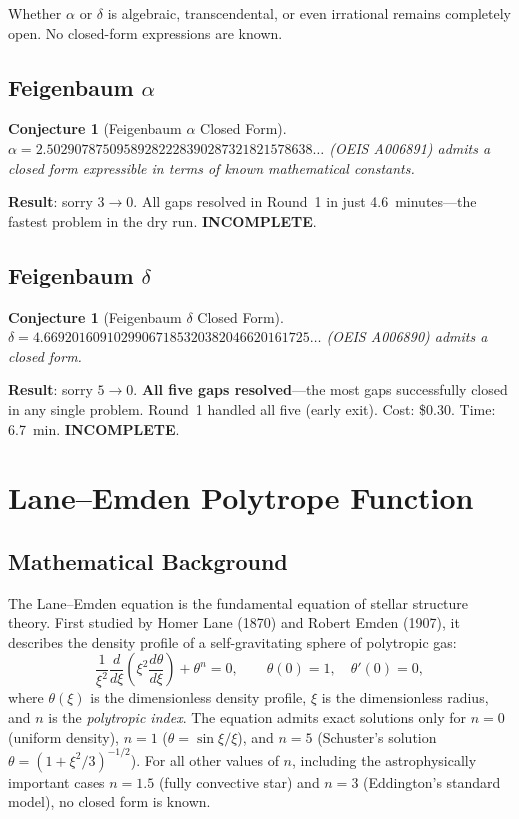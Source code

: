\documentclass[12pt,a4paper]{report}
\theoremstyle{plain}
\newtheorem{conjecture}[theorem]{Conjecture}
\theoremstyle{definition}
\theoremstyle{remark}
\newcommand{\verdict}[1]{\textbf{\textcolor{inkblue}{#1}}}
\begin{document}
Whether $\alpha$ or $\delta$ is algebraic, transcendental, or even irrational
remains completely open. No closed-form expressions are known.

\section{Feigenbaum $\alpha$}

\begin{conjecture}[Feigenbaum \(\alpha\) Closed Form]
$\alpha = 2.50290787509589282228390287321821578638\ldots$ (OEIS A006891) admits a
closed form expressible in terms of known mathematical constants.
\end{conjecture}

\noindent\textbf{Result}: sorry $3 \to 0$. All gaps resolved in Round~1 in just
4.6~minutes—the fastest problem in the dry run. \verdict{INCOMPLETE}.

\section{Feigenbaum $\delta$}

\begin{conjecture}[Feigenbaum \(\delta\) Closed Form]
$\delta = 4.66920160910299067185320382046620161725\ldots$ (OEIS A006890) admits a
closed form.
\end{conjecture}

\noindent\textbf{Result}: sorry $5 \to 0$. \textbf{All five gaps resolved}—the most
gaps successfully closed in any single problem. Round~1 handled all five (early exit).
Cost: \$0.30. Time: 6.7~min. \verdict{INCOMPLETE}.

\chapter{Lane--Emden Polytrope Function}
\label{ch:lane}

\section{Mathematical Background}

The Lane--Emden equation is the fundamental equation of stellar structure theory.
First studied by Homer Lane (1870) and Robert Emden (1907), it describes the density
profile of a self-gravitating sphere of polytropic gas:
\[
  \frac{1}{\xi^2} \frac{d}{d\xi}\!\left(\xi^2 \frac{d\theta}{d\xi}\right) + \theta^n = 0,
  \qquad \theta(0) = 1, \quad \theta'(0) = 0,
\]
where $\theta(\xi)$ is the dimensionless density profile, $\xi$ is the dimensionless
radius, and $n$ is the \emph{polytropic index}. The equation admits exact solutions
only for $n = 0$ (uniform density), $n = 1$ ($\theta = \sin\xi / \xi$), and $n = 5$
(Schuster's solution $\theta = (1 + \xi^2/3)^{-1/2}$). For all other values of $n$,
including the astrophysically important cases $n = 1.5$ (fully convective star) and
$n = 3$ (Eddington's standard model), no closed form is known.
\end{document}
